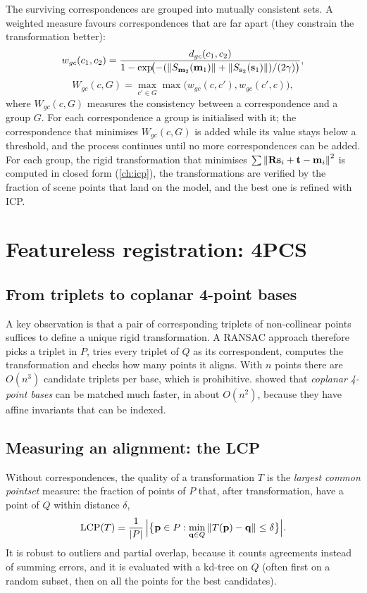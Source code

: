 The surviving correspondences are grouped into mutually consistent sets. A weighted measure
favours correspondences that are far apart (they constrain the transformation better):
\begin{equation}
w_{gc}(c_1,c_2)=\frac{d_{gc}(c_1,c_2)}{1-\exp\!\bigl(-(\left\lVert S_{\mathbf{m}_2}(\mathbf{m}_1)\right\rVert+\left\lVert S_{\mathbf{s}_2}(\mathbf{s}_1)\right\rVert)/(2\gamma)\bigr)},
\end{equation}
\begin{equation}
W_{gc}(c,G)=\max_{c'\in G}\max\bigl(w_{gc}(c,c'),w_{gc}(c',c)\bigr),
\end{equation}
where $W_{gc}(c,G)$ measures the consistency between a correspondence and a group $G$. For each
correspondence a group is initialised with it; the correspondence that minimises $W_{gc}(c,G)$ is
added while its value stays below a threshold, and the process continues until no more
correspondences can be added. For each group, the rigid transformation that minimises
$\sum\left\lVert \mathbf{R}\mathbf{s}_i+\mathbf{t}-\mathbf{m}_i\right\rVert^2$ is computed in closed form (\cref{ch:icp}), the transformations
are verified by the fraction of scene points that land on the model, and the best one is refined
with ICP.

\section{Featureless registration: 4PCS}

\subsection{From triplets to coplanar 4-point bases}

A key observation is that a pair of corresponding triplets of non-collinear points suffices to
define a unique rigid transformation. A RANSAC approach therefore picks a triplet in $P$, tries
every triplet of $Q$ as its correspondent, computes the transformation and checks how many points it
aligns. With $n$ points there are $O(n^3)$ candidate triplets per base, which is prohibitive.
 showed that \emph{coplanar 4-point bases} can be matched much faster, in about
$O(n^2)$, because they have affine invariants that can be indexed.

\subsection{Measuring an alignment: the LCP}

Without correspondences, the quality of a transformation $T$ is the \emph{largest common
pointset} measure: the fraction of points of $P$ that, after transformation, have a point of $Q$
within distance $\delta$,
\begin{equation}
\mathrm{LCP}(T)=\frac{1}{\left\lvert P\right\rvert}\,\Bigl|\bigl\{\mathbf{p}\in P:\min_{\mathbf{q}\in Q}\left\lVert T(\mathbf{p})-\mathbf{q}\right\rVert\le\delta\bigr\}\Bigr| .
\end{equation}
It is robust to outliers and partial overlap, because it counts agreements instead of summing
errors, and it is evaluated with a kd-tree on $Q$ (often first on a random subset, then on all the
points for the best candidates).

